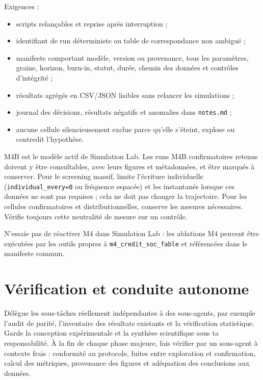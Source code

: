 \documentclass[11pt,a4paper]{article}
\newcommand{\code}[1]{\texttt{\color{navy}#1}}
\newcommand{\file}[1]{\nolinkurl{#1}}
\begin{document}
Exigences :

\begin{itemize}
  \item scripts relançables et reprise après interruption ;
  \item identifiant de run déterministe ou table de correspondance non ambiguë ;
  \item manifeste comportant modèle, version ou provenance, tous les
    paramètres, graine, horizon, burn-in, statut, durée, chemin des données et
    contrôles d'intégrité ;
  \item résultats agrégés en CSV/JSON lisibles sans relancer les simulations ;
  \item journal des décisions, résultats négatifs et anomalies dans
    \code{notes.md} ;
  \item aucune cellule silencieusement exclue parce qu'elle s'éteint, explose
    ou contredit l'hypothèse.
\end{itemize}

M4B est le modèle actif de Simulation Lab. Les runs M4B confirmatoires retenus
doivent y être consultables, avec leurs figures et métadonnées, et être marqués
à conserver. Pour le screening massif, limite l'écriture individuelle
(\code{individual\_every=0} ou fréquence espacée) et les instantanés lorsque
ces données ne sont pas requises ; cela ne doit pas changer la trajectoire.
Pour les cellules confirmatoires et distributionnelles, conserve les mesures
nécessaires. Vérifie toujours cette neutralité de mesure sur un contrôle.

N'essaie pas de réactiver M4 dans Simulation Lab : les ablations M4 peuvent
être exécutées par les outils propres à \file{m4_credit_soc_fable} et
référencées dans le manifeste commun.

\section{Vérification et conduite autonome}

Délègue les sous-tâches réellement indépendantes à des sous-agents, par exemple
l'audit de parité, l'inventaire des résultats existants et la vérification
statistique. Garde la conception expérimentale et la synthèse scientifique sous
ta responsabilité. À la fin de chaque phase majeure, fais vérifier par un
sous-agent à contexte frais : conformité au protocole, fuites entre exploration
et confirmation, calcul des métriques, provenance des figures et adéquation des
conclusions aux données.
\end{document}
